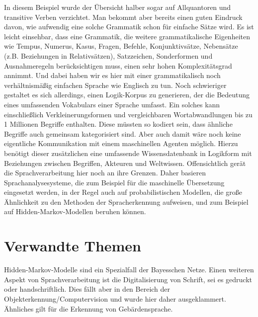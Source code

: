 In diesem Beispiel wurde der Übersicht halber sogar auf Allquantoren und transitive Verben verzichtet.
Man bekommt aber bereits einen guten Eindruck davon, wie aufwendig eine solche Grammatik schon für einfache Sätze wird.
Es ist leicht einsehbar, dass eine Grammatik, die weitere grammatikalische Eigenheiten wie Tempus, Numerus, Kasus, Fragen, Befehle, Konjunktivsätze, Nebensätze (z.B.
Beziehungen in Relativsätzen), Satzzeichen, Sonderformen und Ausnahmeregeln berücksichtigen muss, einen sehr hohen Komplexitätsgrad annimmt.
Und dabei haben wir es hier mit einer grammatikalisch noch verhältnismäßig einfachen Sprache wie Englisch zu tun.
Noch schwieriger gestaltet es sich allerdings, einen Logik-Korpus zu generieren, der die Bedeutung eines umfassenden Vokabulars einer Sprache umfasst.
Ein solches kann einschließlich Verkleinerungsformen und vergleichbaren Wortabwandlungen bis zu 1 Millionen Begriffe enthalten.
Diese müssten so kodiert sein, dass ähnliche Begriffe auch gemeinsam kategorisiert sind.
Aber auch damit wäre noch keine eigentliche Kommunikation mit einem maschinellen Agenten möglich.
Hierzu benötigt dieser zusätzlichen eine umfassende Wissensdatenbank in Logikform mit Beziehungen zwischen Begriffen, Akteuren und Weltwissen.
Offensichtlich gerät die Sprachverarbeitung hier noch an ihre Grenzen.
Daher basieren Sprachanalysesysteme, die zum Beispiel für die maschinelle Übersetzung eingesetzt werden, in der Regel auch auf probabilistischen Modellen, die große Ähnlichkeit zu den Methoden der Spracherkennung aufweisen, und zum Beispiel auf Hidden-Markov-Modellen beruhen können.

\section{Verwandte Themen}
Hidden-Markov-Modelle sind ein Spezialfall der Bayesschen Netze.
Einen weiteren Aspekt von Sprachverarbeitung ist die Digitalisierung von Schrift, sei es gedruckt oder handschriftlich.
Dies fällt aber in den Bereich der Objekterkennung/Computervision und wurde hier daher ausgeklammert.
Ähnliches gilt für die Erkennung von Gebärdensprache.

